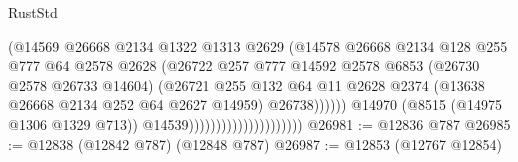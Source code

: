 \begin{lexlean}{RustStd}
\begin{coremodule}
                                                  (@14569
                                                    @26668
                                                    @2134
                                                    @1322
                                                    @1313
                                                    @2629
                                                    (@14578
                                                      @26668
                                                      @2134
                                                      @128
                                                      @255
                                                      @777
                                                      @64
                                                      @2578
                                                      @2628
                                                      (@26722
                                                        @257
                                                        @777
                                                        @14592
                                                        @2578
                                                        @6853
                                                        (@26730 @2578 @26733 @14604)
                                                        (@26721
                                                          @255
                                                          @132
                                                          @64
                                                          @11
                                                          @2628
                                                          @2374
                                                          (@13638
                                                            @26668
                                                            @2134
                                                            @252
                                                            @64
                                                            @2627
                                                            @14959)
                                                          @26738))))))
                                              @14970
                                              (@8515 (@14975 @1306 @1329 @713))
                                              @14539)))))))))))))))))))))
@26981 := @12836 @787
@26985 := @12838 (@12842 @787) (@12848 @787)
@26987 := @12853 (@12767 @12854)

\end{coremodule}
\end{lexlean}
